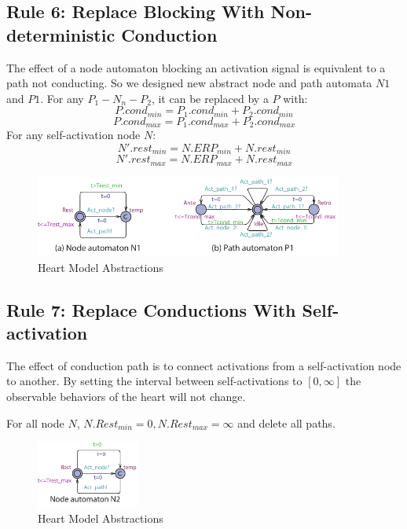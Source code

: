 \subsection{Rule 6: Replace Blocking With Non-deterministic Conduction}
The effect of a node automaton blocking an activation signal is equivalent to a path not conducting. So we designed new abstract node and path automata $N1$ and $P1$. For any $P_1-N_n-P_2$, it can be replaced by a $P$ with:
$$P.cond_{min}=P_1.cond_{min}+P_2.cond_{min}$$
$$P.cond_{max}=P_1.cond_{max}+P_2.cond_{max}$$
For any self-activation node $N$:
$$N'.rest_{min}=N.ERP_{min}+N.rest_{min}$$
$$N'.rest_{max}=N.ERP_{max}+N.rest_{max}$$

\begin{figure}[!h]
		\centering
		\includegraphics[width=0.9\textwidth]{figs/rule5.pdf}
		\caption{\small Heart Model Abstractions}
		\label{fig:rule5}
\end{figure}

\subsection{Rule 7: Replace Conductions With Self-activation}
The effect of conduction path is to connect activations from a self-activation node to another. By setting the interval between self-activations to $[0,\infty]$ the observable behaviors of the heart will not change.

For all node $N$, $N.Rest_{min}=0,N.Rest_{max}=\infty$ and delete all paths.
\begin{figure}[!h]
		\centering
		\includegraphics[width=0.3\textwidth]{figs/rule6.pdf}
		\caption{\small Heart Model Abstractions}
		\label{fig:rule6}
\end{figure}

